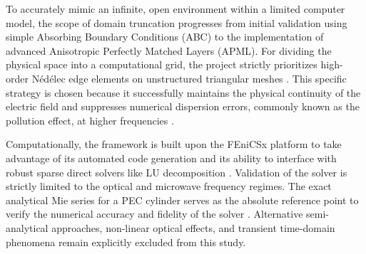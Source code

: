 \documentclass[class=report, crop=false]{standalone}
\begin{document}
\vspace{12pt}

To accurately mimic an infinite, open environment within a limited computer model, the scope of domain truncation progresses from initial validation using simple Absorbing Boundary Conditions (ABC) to the implementation of advanced Anisotropic Perfectly Matched Layers (APML). For dividing the physical space into a computational grid, the project strictly prioritizes high-order N\'{e}d\'{e}lec edge elements on unstructured triangular meshes \citep{Nedelec1980}. This specific strategy is chosen because it successfully maintains the physical continuity of the electric field and suppresses numerical dispersion errors, commonly known as the pollution effect, at higher frequencies \citep{Melenk2024}.

\vspace{12pt}

Computationally, the framework is built upon the FEniCSx platform to take advantage of its automated code generation and its ability to interface with robust sparse direct solvers like LU decomposition \citep{Otto2012, Owusu-Agyemang2025}. Validation of the solver is strictly limited to the optical and microwave frequency regimes. The exact analytical Mie series for a PEC cylinder serves as the absolute reference point to verify the numerical accuracy and fidelity of the solver \citep{Martin1993}. Alternative semi-analytical approaches, non-linear optical effects, and transient time-domain phenomena remain explicitly excluded from this study.
\end{document}
